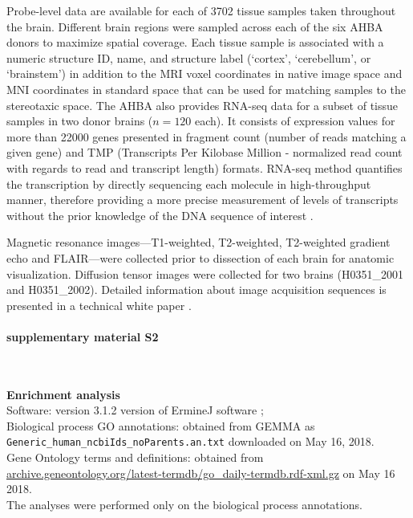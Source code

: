 \documentclass[10pt,A4]{article}
\begin{document}
Probe-level data are available for each of \num{3702} tissue samples taken throughout the brain. Different brain regions were sampled across each of the six AHBA donors to maximize spatial coverage. Each tissue sample is associated with a numeric structure ID, name, and structure label (`cortex', `cerebellum', or `brainstem') in addition to the MRI voxel coordinates in native image space and MNI coordinates in standard space that can be used for matching samples to the stereotaxic space. The AHBA also provides RNA-seq data for a subset of tissue samples in two donor brains ($n=120$ each). It consists of expression values for more than \num{22000} genes presented in fragment count (number of reads matching a given gene) and TMP (Transcripts Per Kilobase Million - normalized read count with regards to read and transcript length) formats. RNA-seq method quantifies the transcription by directly sequencing each molecule in high-throughput manner, therefore providing a more precise measurement of levels of transcripts without the prior knowledge of the DNA sequence of interest \citep{Wang2009}. 

Magnetic resonance images---T1-weighted, T2-weighted, T2-weighted gradient echo and FLAIR---were collected prior to dissection of each brain for anatomic visualization. Diffusion tensor images were collected for two brains (H0351\_2001 and H0351\_2002). Detailed information about image acquisition sequences is presented in a technical white paper \citep{AHBAdoc}. 

\paragraph*{supplementary material S2}\mbox{}\\
\label{SItext2}

\textbf{Enrichment analysis} \\
\noindent Software: version 3.1.2 version of ErmineJ software \citep{Gillis2010};\\
Biological process GO annotations: obtained from GEMMA \citep{Zoubarev2012} as \\  
\texttt{Generic\_human\_ncbiIds\_noParents.an.txt} downloaded on May 16, 2018. \\
Gene Ontology terms and definitions: obtained from \url{archive.geneontology.org/latest-termdb/go_daily-termdb.rdf-xml.gz} on May 16 2018.\\
The analyses were performed only on the biological process annotations. \\
\end{document}
